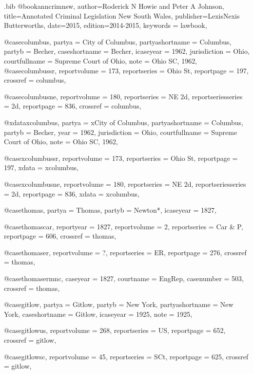 \begin{filecontents*}[overwrite]{\jobname.bib}
@book{anncrimnsw,
author={Roderick N Howie and Peter A Johnson},
title={Annotated Criminal Legislation New South Wales},
publisher={LexisNexis Butterworths},
date={2015},
edition={2014-2015},
keywords = {lawbook},
}

@case{columbus,
  partya = {City of Columbus},
  partyashortname = {Columbus}, 
  partyb = {Becher},
  caseshortname = {Becher},
  icaseyear = {1962},
  jurisdiction = {Ohio},
  courtfullname = {Supreme Court of Ohio},
  note = {Ohio SC, 1962},
}
@case{columbussr,
  reportvolume = {173},
  reportseries = {Ohio St},
  reportpage = {197},
  crossref = {columbus},
}

@case{columbusne,
  reportvolume = {180},
  reportseries = {NE 2d},
  reportseriesseries = {2d},
  reportpage = {836},
  crossref = {columbus},
}

@xdata{xcolumbus,
  partya = {xCity of Columbus},
  partyashortname = {Columbus}, 
  partyb = {Becher},
  year = {1962},
  jurisdiction = {Ohio},
  courtfullname = {Supreme Court of Ohio},
  note = {Ohio SC, 1962},
}

@case{xcolumbussr,
  reportvolume = {173},
  reportseries = {Ohio St},
  reportpage = {197},
  xdata = {xcolumbus},
}

@case{xcolumbusne,
  reportvolume = {180},
  reportseries = {NE 2d},
  reportseriesseries = {2d},
  reportpage = {836},
  xdata = {xcolumbus},
}


@case{thomas,
  partya = {Thomas},
  partyb = {Newton*},
  icaseyear = {1827},
}

@case{thomascar,
  reportyear = {1827},
  reportvolume = {2},
  reportseries = {Car \& P},
  reportpage = {606},
  crossref = {thomas},
}

@case{thomaser,
  reportvolume = {?},
  reportseries = {ER},
  reportpage = {276},
  crossref = {thomas},
}

@case{thomasermnc,
  caseyear = {1827},
  courtname = {EngRep},
  casenumber = {503},
  crossref = {thomas},
}


@case{gitlow,
  partya = {Gitlow},
  partyb = {New York},%
  partyashortname = {New York}, 
  caseshortname = {Gitlow},
  icaseyear = {1925},
  note = {1925},
}


@case{gitlowus,
  reportvolume = {268},
  reportseries = {US},
  reportpage = {652},
  crossref = {gitlow},
}


@case{gitlowsc,
  reportvolume = {45},
  reportseries = {SCt},
  reportpage = {625},
  crossref = {gitlow},
}


\end{filecontents*}
